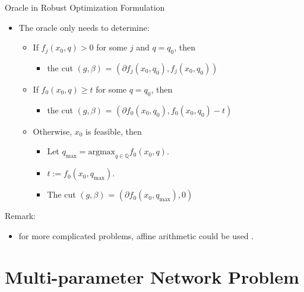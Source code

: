\documentclass[
  ignorenonframetext,
  aspectratio=169,
  serif,onlymath]{beamer}
\providecommand{\tightlist}{%
  \setlength{\itemsep}{0pt}\setlength{\parskip}{0pt}}
\begin{document}
\begin{frame}{Oracle in Robust Optimization Formulation}
\protect\hypertarget{oracle-in-robust-optimization-formulation}{}

\begin{itemize}
\tightlist
\item
  The oracle only needs to determine:

  \begin{itemize}
  \tightlist
  \item
    If \(f_j(x_0, q) > 0\) for some \(j\) and \(q = q_0\), then

    \begin{itemize}
    \tightlist
    \item
      the cut \((g, \beta)\) =
      \((\partial f_j(x_0, q_0), f_j(x_0, q_0))\)
    \end{itemize}
  \item
    If \(f_0(x_0, q) \ge t\) for some \(q = q_0\), then

    \begin{itemize}
    \tightlist
    \item
      the cut \((g, \beta)\) =
      \((\partial f_0(x_0, q_0), f_0(x_0, q_0) - t)\)
    \end{itemize}
  \item
    Otherwise, \(x_0\) is feasible, then

    \begin{itemize}
    \tightlist
    \item
      Let \(q_{\max} = \text{argmax}_{q \in \mathbb Q} f_0(x_0, q)\).
    \item
      \(t := f_0(x_0, q_{\max})\).
    \item
      The cut \((g, \beta)\) = \((\partial f_0(x_0, q_{\max}), 0)\)
    \end{itemize}
  \end{itemize}
\end{itemize}

Remark:

\begin{itemize}
\tightlist
\item
  for more complicated problems, affine arithmetic could be used
  \citep{liu2007robust}.
\end{itemize}

\end{frame}

\hypertarget{multi-parameter-network-problem}{%
\section{Multi-parameter Network
Problem}\label{multi-parameter-network-problem}}
\end{document}
